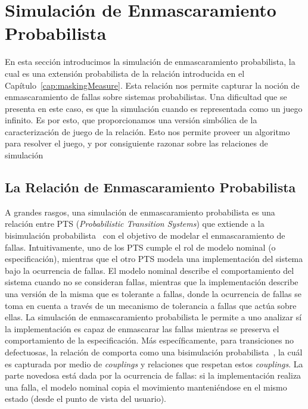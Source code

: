 \section{Simulación de Enmascaramiento Probabilista} \label{sec:mask_dist_prob}

En esta sección introducimos la simulación de enmascaramiento probabilista, la cual es una extensión probabilista de la relación introducida en el Capítulo~\ref{cap:maskingMeasure}. Esta relación nos permite capturar la noción de enmascaramiento de fallas sobre sistemas probabilistas. Una dificultad que se presenta en este caso, es que la simulación cuando es representada como un juego infinito. Es por esto, que  proporcionamos una versión simbólica de la caracterización de juego de la relación. Esto nos permite proveer un algoritmo para resolver el juego, y por consiguiente razonar sobre las relaciones de simulación

\subsection{La Relación de Enmascaramiento Probabilista}%
%
A grandes rasgos, una simulación de enmascaramiento probabilista es una relación entre PTS (\emph{Probabilistic Transition Systems}) que extiende a la bisimulación probabilista~\cite{Larsen91}
con el objetivo  de modelar el enmascaramiento de fallas.  Intuitivamente, uno de los PTS
cumple el rol de modelo nominal (o especificación), mientras que el otro PTS modela una implementación del sistema bajo la ocurrencia de fallas. El modelo nominal describe el comportamiento del sistema cuando no se consideran fallas, mientras que la implementación describe una versión de la misma que es tolerante a fallas, donde la ocurrencia de fallas se toma en cuenta a través de un mecanismo de tolerancia a fallas que actúa sobre ellas.  La simulación de enmascaramiento probabilista le permite a uno analizar sí la implementación es capaz de enmascarar las fallas mientras se preserva el comportamiento de la especificación. Más específicamente, para transiciones no defectuosas, la relación de comporta como una bisimulación probabilista~\cite{Larsen91}, la cuál es capturada por medio de \emph{couplings} y relaciones que respetan estos \emph{couplings}. %
La parte novedosa está dada por la ocurrencia de fallas: si la implementación realiza una falla, el modelo nominal copia el movimiento manteniéndose en el mismo estado (desde el punto de vista del usuario).

